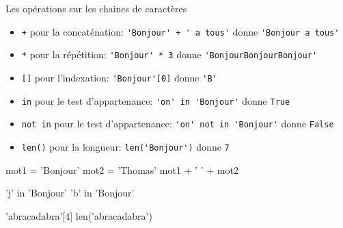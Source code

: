 \begin{easybox}{Les opérations sur les chaines de caractères}{}   
    \smallskip
    \begin{itemize}
        \item[] \texttt{+} \quad pour la concaténation:  \verb~'Bonjour' + ' a tous'~ donne \verb~'Bonjour a tous'~
        \item[] \texttt{*} \quad pour la répétition:  \verb~'Bonjour' * 3~ donne \verb~'BonjourBonjourBonjour'~
        \item[] \texttt{[]} \quad pour l'indexation:  \verb~'Bonjour'[0]~ donne \verb~'B'~
        \item[] \texttt{in} \quad pour le test d'appartenance:  \verb~'on' in 'Bonjour'~ donne \verb~True~
        \item[] \texttt{not in} \quad pour le test d'appartenance:  \verb~'on' not in 'Bonjour'~ donne \verb~False~
        \item[] \texttt{len()} \quad pour la longueur:  \verb~len('Bonjour')~ donne \verb~7~
       
    \end{itemize}
\end{easybox}


\begin{minipage}[t]{0.32\linewidth}
    \begin{ConsolePythontex}[TaillePolice=\large, Label=false]{}
        mot1 = 'Bonjour'
        mot2 = 'Thomas'
        mot1 + ' ' + mot2
    \end{ConsolePythontex}
\end{minipage}\hfill
\begin{minipage}[t]{0.32\linewidth}
    \begin{ConsolePythontex}[TaillePolice=\large, Label=false]{}
        'j' in 'Bonjour'
        'b' in 'Bonjour'
    \end{ConsolePythontex}
\end{minipage}\hfill{}
\begin{minipage}[t]{0.32\linewidth}
    \begin{ConsolePythontex}[TaillePolice=\large, Label=false]{}
        'abracadabra'[4]
        len('abracadabra')
    \end{ConsolePythontex}
\end{minipage}

